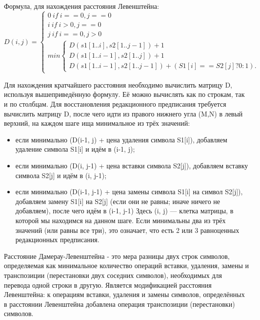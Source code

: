\documentclass[a4paper, 14pt]{article}
\begin{document}
	Формула, для нахождения расстояния Левенштейна\cite{ifmo_lev}:
	\[
	  D(i,j)=\begin{cases}
	               0\   if\ i == 0, j == 0\\
	               i\   if\ i > 0, j == 0\\
	               j\   if\ i == 0, j > 0\\
	               min\begin{cases}
	               D(s1[1..i],s2[1..j-1]) + 1\\
	               D(s1[1..i-1],s2[1..j]) + 1\\
	               D(s1[1..i-1],s2[1..j-1]) + (S1[i] == S2[j] ? 0 : 1).
	               \end{cases}
	            \end{cases}
	\]
	
    Для нахождения кратчайшего расстояния необходимо вычислить матрицу D, используя вышеприведённую формулу. Её можно вычислять как по строкам, так и по столбцам. Для восстановления редакционного предписания требуется вычислить матрицу D, после чего идти из правого нижнего угла (M,N) в левый верхний, на каждом шаге ища минимальное из трёх значений:
    \begin{itemize}
    \item если минимально (D(i-1, j) + цена удаления символа S1[i]), добавляем удаление     символа S1[i] и идём в (i-1, j);
    \item если минимально (D(i, j-1) + цена вставки символа S2[j]), добавляем вставку     символа S2[j] и идём в (i, j-1);
    \item если минимально (D(i-1, j-1) + цена замены символа S1[i] на символ S2[j]),     добавляем замену S1[i] на S2[j] (если они не равны; иначе ничего не     добавляем), после чего идём в (i-1, j-1)
    Здесь (i, j) — клетка матрицы, в которой мы находимся на данном шаге. Если     минимальны два из трёх значений (или равны все три), это означает, что есть 2     или 3 равноценных редакционных предписания.
	\end{itemize}
	
	Расстояние Дамерау-Левенштейна - это мера разницы двух строк символов, определяемая как минимальное количество операций вставки, удаления, замены и транспозиции (перестановки двух соседних символов), необходимых для перевода одной строки в другую. Является модификацией расстояния Левенштейна: к операциям вставки, удаления и замены символов, определённых в расстоянии Левенштейна добавлена операция транспозиции (перестановки) символов.
	
\end{document}
